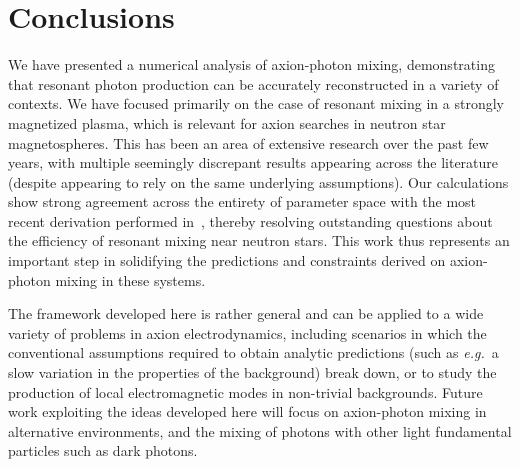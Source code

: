 \documentclass[twocolumn,superscriptaddress,floatfix,preprintnumbers,prd,nofootinbib,aps,10pt]{revtex4-2}
\renewcommand\({\left(}
\renewcommand\){\right)}
\renewcommand\[{\left[}
\renewcommand\]{\right]}
\newcommand\eg{{\it e.g.}~}
\begin{document}


\section{Conclusions}\label{sec:conclusions}
We have presented a numerical analysis of axion-photon mixing, demonstrating that resonant photon production can be accurately reconstructed in a variety of contexts. We have focused primarily on the case of resonant mixing in a strongly magnetized plasma, which is relevant for axion searches in neutron star magnetospheres. This has been an area of extensive research over the past few years, with multiple seemingly discrepant results appearing across the literature (despite appearing to rely on the same underlying assumptions). Our calculations show strong agreement across the entirety of parameter space with the most recent derivation performed in~\cite{mcdonald2023axionphoton}, thereby resolving outstanding questions about the efficiency of resonant mixing near neutron stars. This work thus represents an important step in solidifying the predictions and constraints derived on axion-photon mixing in these systems.

The framework developed here is rather general and can be applied to a wide variety of problems in axion electrodynamics, including scenarios in which the conventional assumptions required to obtain analytic predictions (such as \eg a slow variation in the properties of the background) break down, or to study the production of local electromagnetic modes in non-trivial backgrounds. Future work exploiting the ideas developed here will focus on axion-photon mixing in alternative environments, and the mixing of photons with other light fundamental particles such as dark photons.
\end{document}
